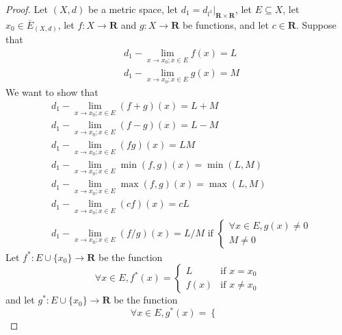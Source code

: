 \begin{proof}
    Let \((X, d)\) be a metric space, let \(d_1 = d_{l^1}|_{\mathbf{R} \times \mathbf{R}}\), let \(E \subseteq X\), let \(x_0 \in \overline{E}_{(X, d)}\), let \(f : X \to \mathbf{R}\) and \(g : X \to \mathbf{R}\) be functions, and let \(c \in \mathbf{R}\).
    Suppose that
    \begin{align*}
         & d_1 - \lim_{x \to x_0 ; x \in E} f(x) = L \\
         & d_1 - \lim_{x \to x_0 ; x \in E} g(x) = M
    \end{align*}
    We want to show that
    \begin{align*}
         & d_1 - \lim_{x \to x_0 ; x \in E} (f + g)(x) = L + M                                          \\
         & d_1 - \lim_{x \to x_0 ; x \in E} (f - g)(x) = L - M                                          \\
         & d_1 - \lim_{x \to x_0 ; x \in E} (fg)(x) = LM                                                \\
         & d_1 - \lim_{x \to x_0 ; x \in E} \min(f, g)(x) = \min(L, M)                                  \\
         & d_1 - \lim_{x \to x_0 ; x \in E} \max(f, g)(x) = \max(L, M)                                  \\
         & d_1 - \lim_{x \to x_0 ; x \in E} (cf)(x) = cL                                                \\
         & d_1 - \lim_{x \to x_0 ; x \in E} (f / g)(x) = L / M \text{ if } \begin{cases}
                                                                               \forall x \in E, g(x) \neq 0 \\
                                                                               M \neq 0
                                                                           \end{cases}
    \end{align*}
    Let \(f^* : E \cup \{x_0\} \to \mathbf{R}\) be the function
    \[
        \forall x \in E, f^*(x) = \begin{cases}
            L    & \text{if } x = x_0    \\
            f(x) & \text{if } x \neq x_0
        \end{cases}
    \]
    and let \(g^* : E \cup \{x_0\} \to \mathbf{R}\) be the function
    \[
        \forall x \in E, g^*(x) = \begin{cases}

\end{cases}\]
\end{proof}
